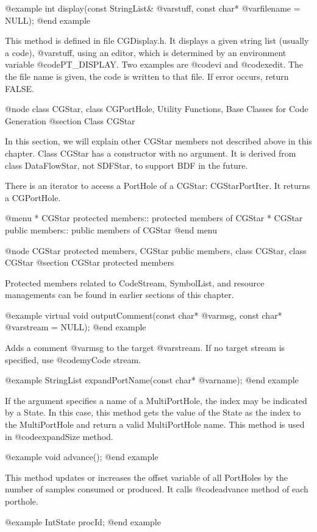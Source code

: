 @example
int display(const StringList& @var{stuff}, const char* @var{filename} = NULL);
@end example

This method is defined in file CGDisplay.h. It displays a given string list
(usually a code), @var{stuff}, using an editor, which is determined by
an environment variable @code{PT_DISPLAY}. Two examples are @code{vi} and
@code{xedit}. The the file name is given, the code is written to that file.
If error occurs, return FALSE.

@node class CGStar, class CGPortHole, Utility Functions, Base Classes for Code Generation
@section Class CGStar

In this section, we will explain other CGStar members not described above in
this chapter. Class CGStar has a constructor with no argument. It is derived
from class DataFlowStar, not SDFStar, to support BDF in the future.

There is an iterator to access a PortHole of a CGStar: CGStarPortIter. It
returns a CGPortHole.

@menu
* CGStar protected members::		protected members of CGStar
* CGStar public members::		public members of CGStar
@end menu

@node CGStar protected members, CGStar public members, class CGStar, class CGStar
@section CGStar protected members

Protected members related to CodeStream, SymbolList, and resource
managements can be found in earlier sections of this chapter.

@example
virtual void outputComment(const char* @var{msg}, const char* @var{stream} = NULL);
@end example

Adds a comment @var{msg} to the target @var{stream}. If no target stream is
specified, use @code{myCode} stream.

@example
StringList expandPortName(const char* @var{name});
@end example

If the argument specifies a name of a MultiPortHole, the index may be
indicated by a State. In this case, this method gets the value of the
State as the index to the MultiPortHole and return a valid MultiPortHole name.
This method is used in @code{expandSize} method.

@example
void advance();
@end example

This method updates or increases the offset variable of all PortHoles by
the number of samples consumed or produced. It calls @code{advance} method
of each porthole.

@example
IntState procId;
@end example

